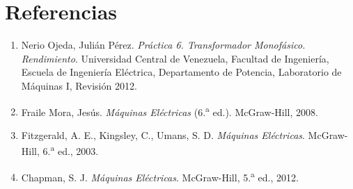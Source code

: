 \documentclass[12pt]{article}
\begin{document}
\begin{table}[H]
\centering
\small
\renewcommand{\arraystretch}{1.2}
\caption{Registro experimental del banco en paralelo bajo carga resistiva}
\end{table}
\newpage

\section{Referencias}
\begin{enumerate}
    \item Nerio Ojeda, Juli\'an P\'erez. \textit{Pr\'actica 6. Transformador Monof\'asico. Rendimiento}. Universidad Central de Venezuela, Facultad de Ingenier\'ia, Escuela de Ingenier\'ia El\'ectrica, Departamento de Potencia, Laboratorio de M\'aquinas I, Revisi\'on 2012.
    \item Fraile Mora, Jes\'us. \textit{M\'aquinas El\'ectricas} (6.\textsuperscript{a} ed.). McGraw-Hill, 2008.
    \item Fitzgerald, A. E., Kingsley, C., Umans, S. D. \textit{M\'aquinas El\'ectricas}. McGraw-Hill, 6.\textsuperscript{a} ed., 2003.
    \item Chapman, S. J. \textit{M\'aquinas El\'ectricas}. McGraw-Hill, 5.\textsuperscript{a} ed., 2012.
\end{enumerate}
\end{document}
